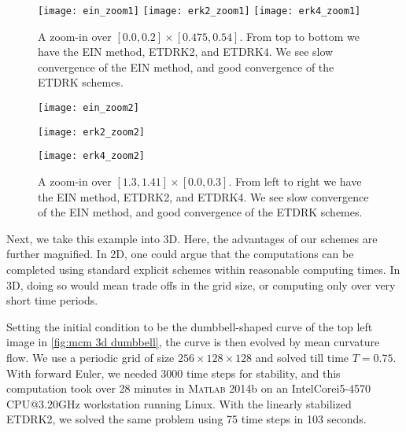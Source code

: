 \begin{figure}[htb!]
        \centering
\texttt{[image: ein\_zoom1]}
\texttt{[image: erk2\_zoom1]}
\texttt{[image: erk4\_zoom1]}
\caption[{A zoom-in over $ [0.0,0.2]\times [0.475,0.54]$ to inspect convergence.}]{A zoom-in over $[0.0, 0.2]\times [0.475, 0.54]$. From top to bottom we have the EIN method, ETDRK2, and ETDRK4. We see slow convergence of the EIN method, and good convergence of the ETDRK schemes.}
\label{fig:mcm zoom in 1}
\end{figure}

\begin{figure}[htb!]
        \centering
\begin{minipage}{0.30\textwidth}
        \texttt{[image: ein\_zoom2]}
\end{minipage}
\begin{minipage}{0.30\textwidth}
        \texttt{[image: erk2\_zoom2]}
\end{minipage}
\begin{minipage}{0.30\textwidth}
        \texttt{[image: erk4\_zoom2]}
\end{minipage}
\caption[{A zoom-in over $[1.3,1.41]\times [0.0, 0.3]$ to inspect convergence.}]{A zoom-in over $[1.3,1.41]\times [0.0, 0.3]$. From left to right we have the EIN method, ETDRK2, and ETDRK4. We see slow convergence of the EIN method, and good convergence of the ETDRK schemes.}
\label{fig:mcm zoom in 2}
\end{figure}

Next, we take this example into 3D. Here, the advantages of our schemes are further magnified. In 2D, one could argue that the computations can be completed using standard explicit schemes within reasonable computing times. In 3D, doing so would mean trade offs in the grid size, or computing only over very short time periods. 

Setting the initial condition to be the dumbbell-shaped curve of the top left image in \cref{fig:mcm 3d dumbbell}, the curve is then evolved by mean curvature flow. We use a periodic grid of size $256\times 128\times 128$ and solved till time $T=0.75$. With forward Euler, we needed $3000$ time steps for stability, and this computation took over 28 minutes in \textsc{Matlab} 2014b on an Intel\textsuperscript{\textregistered}Core\textsuperscript{\texttrademark}i5-4570 CPU@3.20GHz workstation running Linux. With the linearly stabilized ETDRK2, we solved the same problem using 75 time steps in 103 seconds.

